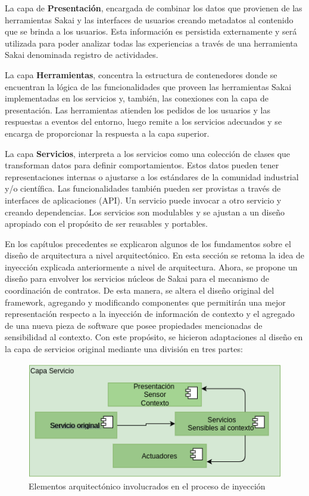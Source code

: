 La capa de \textbf{Presentación}, encargada de combinar los datos que provienen de las herramientas Sakai y las interfaces de usuarios creando metadatos al contenido que se brinda a los usuarios. Esta información es persistida externamente y será utilizada para poder analizar todas las experiencias a través de una herramienta Sakai denominada registro de actividades.  

La capa \textbf{Herramientas}, concentra la estructura de contenedores donde se encuentran la lógica de las funcionalidades que proveen las herramientas Sakai implementadas en los servicios y, también, las conexiones con la capa de presentación. Las herramientas atienden los pedidos de los usuarios y las respuestas a eventos del entorno, luego remite a los servicios adecuados y se encarga de proporcionar la respuesta a la capa superior.


La capa \textbf{Servicios}, interpreta a los servicios como una colección de clases que transforman datos para definir comportamientos. Estos datos pueden tener representaciones internas o ajustarse a los estándares de la comunidad industrial y/o científica. Las funcionalidades también pueden ser provistas a través de interfaces de aplicaciones (API). Un servicio puede invocar a otro servicio y creando dependencias. Los servicios son modulables y se ajustan a un diseño apropiado con el propósito de ser reusables y portables.

En los  capítulos precedentes se explicaron algunos de los fundamentos sobre el diseño de arquitectura a nivel arquitectónico. En esta sección se retoma la idea de inyección explicada anteriormente a nivel de arquitectura. Ahora, se propone un diseño para envolver los servicios núcleos de Sakai para el mecanismo de coordinación de contratos. De esta manera, se altera el diseño original del framework, agregando y modificando componentes que permitirán una mejor representación respecto a la inyección de información de contexto y el agregado de una nueva pieza de software que posee propiedades mencionadas de sensibilidad al contexto. Con este propósito, se hicieron adaptaciones al diseño en la capa de servicios original \cite{arqDHD17} mediante una división en tres partes:


\begin{figure}
\begin{center}
\includegraphics[scale=0.55]{Ch2/CapaServicio.png}
\caption{Elementos arquitectónico involucrados en el proceso de inyección} \label{fig:CapaServicio}
\end{center}
\end{figure} 


